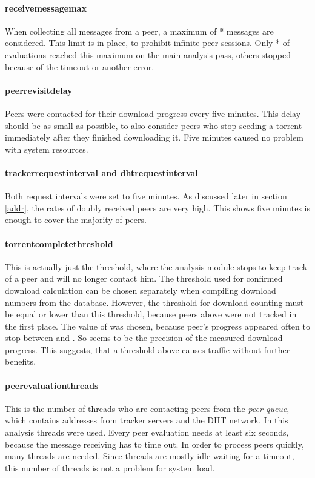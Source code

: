 \documentclass[10pt, a4paper, twoside, headsepline]{scrbook}
\renewcommand{\_}{\origunderscore\allowbreak}
\begin{document}
\paragraph{receive\_message\_max}
When collecting all messages from a peer, a maximum of * messages are considered. This limit is in place, to prohibit infinite peer sessions. Only * of evaluations reached this maximum on the main analysis pass, others stopped because of the timeout or another error.

\paragraph{peer\_revisit\_delay}
Peers were contacted for their download progress every five minutes. This delay should be as small as possible, to also consider peers who stop seeding a torrent immediately after they finished downloading it. Five minutes caused no problem with system resources.

\paragraph{tracker\_request\_interval and dht\_request\_interval}
Both request intervals were set to five minutes. As discussed later in section \ref{addr}, the rates of doubly received peers are very high. This shows five minutes is enough to cover the majority of peers.

\paragraph{torrent\_complete\_threshold}
This is actually just the threshold, where the analysis module stops to keep track of a peer and will no longer contact him. The threshold used for confirmed download calculation can be chosen separately when compiling download numbers from the database. However, the threshold for download counting must be equal or lower than this threshold, because peers above were not tracked in the first place. The value of  was chosen, because peer's progress appeared often to stop between  and . So  seems to be the precision of the measured download progress. This suggests, that a threshold above  causes traffic without further benefits.

\paragraph{peer\_evaluation\_threads}
This is the number of threads who are contacting peers from the \emph{peer queue}, which contains addresses from tracker servers and the DHT network. In this analysis  threads were used. Every peer evaluation needs at least six seconds, because the message receiving has to time out. In order to process peers quickly, many threads are needed. Since threads are mostly idle waiting for a timeout, this number of threads is not a problem for system load.
\end{document}
